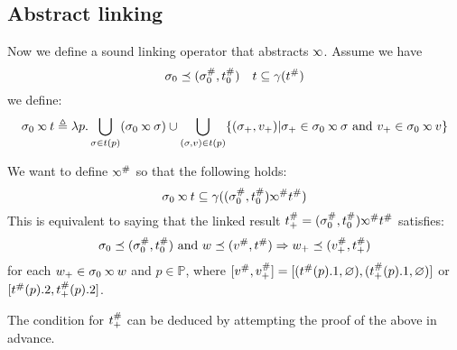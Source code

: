 \subsection{Abstract linking}
Now we define a sound linking operator that abstracts $\semlink$.
Assume we have
\[\sigma_0\preceq({\sigma}^{\#}_0,{t}^{\#}_0)\quad t\subseteq\gamma({t}^{\#})\]
we define:
\[\ctx_0\semlink\ptree\triangleq\lambda p.\bigcup_{\ctx\in t(p)}(\ctx_0\semlink\ctx)\cup\bigcup_{(\ctx,v)\in t(p)}\{(\ctx_+,v_+)|\ctx_+\in\ctx_0\semlink\ctx\text{ and }v_+\in\ctx_0\semlink v\}\]

We want to define $\Abs\semlink$ so that the following holds:
\[\ctx_0\semlink\ptree\subseteq\gamma((\Abs{\ctx}_0,\Abs{\ptree}_0)\Abs\semlink\Abs\ptree)\]
This is equivalent to saying that the linked result $\Abs\ptree_+=(\Abs\ctx_0,\Abs\ptree_0)\Abs\semlink\Abs\ptree$ satisfies:
\[\sigma_0\preceq({\sigma}^{\#}_0,{t}^{\#}_0)\text{ and }w\preceq({v}^{\#},{t}^{\#})\Rightarrow w_+\preceq({v}^{\#}_+,{t}^{\#}_+)\]
for each $w_+\in\ctx_0\semlink w$ and $p\in\mathbb{P}$,
where $[{v}^{\#},{v}^{\#}_+] = [({t}^{\#}(p).1,\varnothing),({t}^{\#}_+(p).1,\varnothing)]$ or $[{t}^{\#}(p).2,{t}^{\#}_+(p).2]$.

The condition for ${t}^{\#}_+$ can be deduced by attempting the proof of the above in advance.


